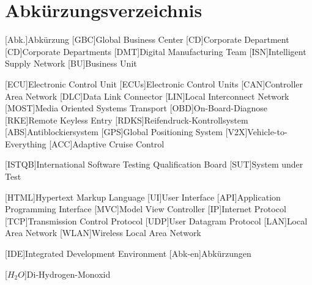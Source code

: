 
\chapter*{Abkürzungsverzeichnis}                   %

\begin{acronym}[DHBW]
 [Abk.]{Abkürzung}
 [GBC]{Global Business Center}
 [CD]{Corporate Department}
 [CD]{Corporate Departments}
 [DMT]{Digital Manufacturing Team}
 [ISN]{Intelligent Supply Network}
 [BU]{Business Unit}
 
 [ECU]{Electronic Control Unit}
 [ECUs]{Electronic Control Units}
 [CAN]{Controller Area Network}
 [DLC]{Data Link Connector}
 [LIN]{Local Interconnect Network}
 [MOST]{Media Oriented Systems Transport}
 [OBD]{On-Board-Diagnose} 
 [RKE]{Remote Keyless Entry}
 [RDKS]{Reifendruck-Kontrollsystem}
 [ABS]{Antiblockiersystem}
 [GPS]{Global Positioning System}
 [V2X]{Vehicle-to-Everything}
 [ACC]{Adaptive Cruise Control}
 
 [ISTQB]{International Software Testing Qualification Board}
 [SUT]{System under Test}
 
 [HTML]{Hypertext Markup Language}
 [UI]{User Interface}
 [API]{Application Programming Interface}
 [MVC]{Model View Controller}
 [IP]{Internet Protocol}
 [TCP]{Transmission Control Protocol}
 [UDP]{User Datagram Protocol}
 [LAN]{Local Area Network}
 [WLAN]{Wireless Local Area Network}
 
 

 [IDE]{Integrated Development Environment}
 [Abk-en]{Abkürzungen}

 [\ensuremath{H_2O}]{Di-Hydrogen-Monoxid}

\end{acronym}
